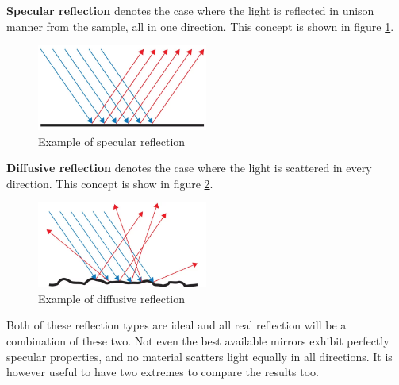 \documentclass{article}
\begin{document}
\textbf{Specular reflection} denotes the case where the light is reflected in unison manner from the sample, all in one direction. This concept is shown in figure \ref{fig:specular_reflection}.

\begin{figure}[h!]
    \centering
    \includegraphics[width=0.5\textwidth]{figures/theory/Specular-Reflection.png}
    \caption{Example of specular reflection \cite{SpecularReflectionOcean}}
    \label{fig:specular_reflection}
\end{figure}

\textbf{Diffusive reflection} denotes the case where the light is scattered in every direction. This concept is show in figure \ref{fig:diffusive_reflection}.

\begin{figure}[h!]
    \centering
    \includegraphics[width=0.5\textwidth]{figures/theory/Diffuse-Reflection.png}
    \caption{Example of diffusive reflection \cite{DiffuseReflectionOcean}}
    \label{fig:diffusive_reflection}
\end{figure}

Both of these reflection types are ideal and all real reflection will be a combination of these two. Not even the best available mirrors exhibit perfectly specular properties, and no material scatters light equally in all directions. It is however useful to have two extremes to compare the results too. 


\end{document}
